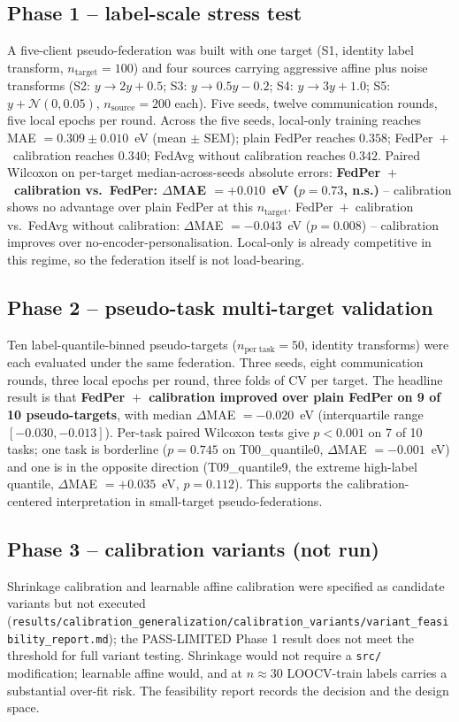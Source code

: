 \documentclass[11pt,a4paper]{article}
\begin{document}
\subsection{Phase 1 -- label-scale stress test}
A five-client pseudo-federation was built with one target (S1, identity label transform, $n_{\mathrm{target}} = 100$) and four sources carrying aggressive affine plus noise transforms (S2: $y \to 2y + 0.5$; S3: $y \to 0.5y - 0.2$; S4: $y \to 3y + 1.0$; S5: $y + \mathcal{N}(0, 0.05)$, $n_{\mathrm{source}} = 200$ each). Five seeds, twelve communication rounds, five local epochs per round. Across the five seeds, local-only training reaches MAE $= 0.309 \pm 0.010$~eV (mean $\pm$ SEM); plain FedPer reaches $0.358$; FedPer~$+$~calibration reaches $0.340$; FedAvg without calibration reaches $0.342$. Paired Wilcoxon on per-target median-across-seeds absolute errors: \textbf{FedPer~$+$~calibration vs.\ FedPer: $\Delta$MAE $= +0.010$~eV ($p = 0.73$, n.s.)} -- calibration shows no advantage over plain FedPer at this $n_{\mathrm{target}}$. FedPer~$+$~calibration vs.\ FedAvg without calibration: $\Delta$MAE $= -0.043$~eV ($p = 0.008$) -- calibration improves over no-encoder-personalisation. Local-only is already competitive in this regime, so the federation itself is not load-bearing.

\subsection{Phase 2 -- pseudo-task multi-target validation}
Ten label-quantile-binned pseudo-targets ($n_{\mathrm{per\;task}} = 50$, identity transforms) were each evaluated under the same federation. Three seeds, eight communication rounds, three local epochs per round, three folds of CV per target. The headline result is that \textbf{FedPer~$+$~calibration improved over plain FedPer on 9 of 10 pseudo-targets}, with median $\Delta$MAE $= -0.020$~eV (interquartile range $[-0.030, -0.013]$). Per-task paired Wilcoxon tests give $p < 0.001$ on 7 of 10 tasks; one task is borderline ($p = 0.745$ on T00\_quantile0, $\Delta$MAE $= -0.001$~eV) and one is in the opposite direction (T09\_quantile9, the extreme high-label quantile, $\Delta$MAE $= +0.035$~eV, $p = 0.112$). This supports the calibration-centered interpretation in small-target pseudo-federations.

\subsection{Phase 3 -- calibration variants (not run)}
Shrinkage calibration and learnable affine calibration were specified as candidate variants but not executed (\texttt{results/calibration\_generalization/calibration\_variants/variant\_feasibility\_report.md}); the PASS-LIMITED Phase 1 result does not meet the threshold for full variant testing. Shrinkage would not require a \texttt{src/} modification; learnable affine would, and at $n \approx 30$ LOOCV-train labels carries a substantial over-fit risk. The feasibility report records the decision and the design space.
\end{document}
